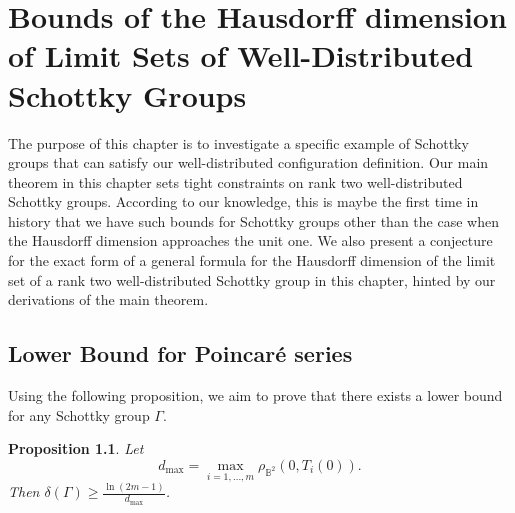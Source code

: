 \documentclass[12pt,oneside]{sfsuthesis}
\theoremstyle{plain} %
\newtheorem{proposition}[theorem]{Proposition}
\theoremstyle{definition}  %
\theoremstyle{remark}  %
\theoremstyle{plain}
\begin{document}
{\chapter{Bounds of the Hausdorff dimension of Limit Sets of Well-Distributed Schottky Groups}

The purpose of this chapter is to investigate a specific example of Schottky groups that can satisfy our well-distributed configuration definition. Our main theorem in this chapter sets tight constraints on rank two well-distributed Schottky groups. According to our knowledge, this is maybe the first time in history that we have such bounds for Schottky groups other than the case when the Hausdorff dimension approaches the unit one. We also present a conjecture for the exact form of a general formula for the Hausdorff dimension of the limit set of a rank two well-distributed Schottky group in this chapter, hinted by our derivations of the main theorem.


\section{Lower Bound for Poincar\'{e} series}


Using the following proposition, we aim to prove that there exists a lower bound for any Schottky group $\Gamma$.
\begin{proposition}\label{prop 1}
Let $$d_{\max} = \max_{i=1,..., m} \rho_{\mathbb{B}^2} (0, T_i (0)).$$
 Then $\delta (\Gamma) \ge \frac{\ln (2m-1)}{d_{\max}}$. 
\end{proposition}

}
\end{document}
